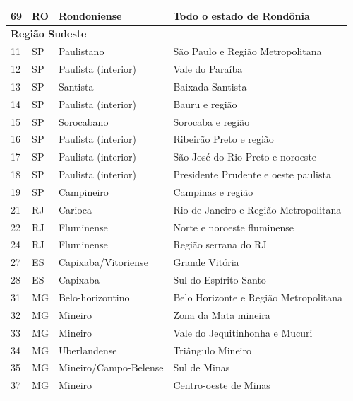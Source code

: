 \begin{table}[ht]
\begin{tabular}{llll}
    69 & RO    & Rondoniense       & Todo o estado de Rondônia             \\
    \midrule
    \multicolumn{4}{l}{\textbf{Região Sudeste}} \\ 
    11 & SP & Paulistano            & São Paulo e Região Metropolitana        \\
    12 & SP & Paulista (interior)   & Vale do Paraíba                         \\
    13 & SP & Santista              & Baixada Santista                        \\
    14 & SP & Paulista (interior)   & Bauru e região                          \\
    15 & SP & Sorocabano            & Sorocaba e região                       \\
    16 & SP & Paulista (interior)   & Ribeirão Preto e região                 \\
    17 & SP & Paulista (interior)   & São José do Rio Preto e noroeste        \\
    18 & SP & Paulista (interior)   & Presidente Prudente e oeste paulista    \\
    19 & SP & Campineiro            & Campinas e região                       \\
    21 & RJ & Carioca               & Rio de Janeiro e Região Metropolitana    \\
    22 & RJ & Fluminense            & Norte e noroeste fluminense             \\
    24 & RJ & Fluminense            & Região serrana do RJ                    \\
    27 & ES & Capixaba/Vitoriense   & Grande Vitória                          \\
    28 & ES & Capixaba              & Sul do Espírito Santo                   \\
    31 & MG & Belo-horizontino      & Belo Horizonte e Região Metropolitana    \\
    32 & MG & Mineiro               & Zona da Mata mineira                    \\
    33 & MG & Mineiro               & Vale do Jequitinhonha e Mucuri          \\
    34 & MG & Uberlandense          & Triângulo Mineiro                       \\
    35 & MG & Mineiro/Campo-Belense & Sul de Minas                            \\
    37 & MG & Mineiro               & Centro-oeste de Minas                   \\

\end{tabular}
\end{table}
